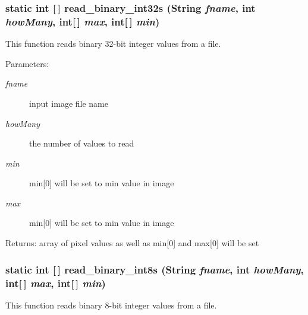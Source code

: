 \subsubsection{\setlength{\rightskip}{0pt plus 5cm}static int [$\,$] read\_\-binary\_\-int32s (String {\em fname}, int {\em how\-Many}, int[$\,$] {\em max}, int[$\,$] {\em min})\hspace{0.3cm}{\tt  [static, protected]}}\label{class_c_s_image_viewer_1_1pnm_helper_bd21c52e494d6dda7df0c988a5194651}


This function reads binary 32-bit integer values from a file. 

\begin{Desc}
\item[Parameters:]
\begin{description}
\item[{\em fname}]input image file name \item[{\em how\-Many}]the number of values to read \item[{\em min}]min[0] will be set to min value in image \item[{\em max}]min[0] will be set to min value in image\end{description}
\end{Desc}
\begin{Desc}
\item[Returns:]array of pixel values as well as min[0] and max[0] will be set \end{Desc}
\subsubsection{\setlength{\rightskip}{0pt plus 5cm}static int [$\,$] read\_\-binary\_\-int8s (String {\em fname}, int {\em how\-Many}, int[$\,$] {\em max}, int[$\,$] {\em min})\hspace{0.3cm}{\tt  [static, protected]}}\label{class_c_s_image_viewer_1_1pnm_helper_f566cc8ea17d5d3a35d8e49a747c9fb8}


This function reads binary 8-bit integer values from a file. 

